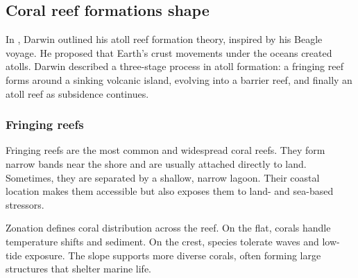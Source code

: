\subsection{Coral reef formations shape}
In \cite{Darwin1842}, Darwin outlined his atoll reef formation theory, inspired by his Beagle voyage. He proposed that Earth's crust movements under the oceans created atolls. Darwin described a three-stage process in atoll formation: a fringing reef forms around a sinking volcanic island, evolving into a barrier reef, and finally an atoll reef as subsidence continues.

\subsubsection{Fringing reefs}
Fringing reefs are the most common and widespread coral reefs. They form narrow bands near the shore and are usually attached directly to land. Sometimes, they are separated by a shallow, narrow lagoon. Their coastal location makes them accessible but also exposes them to land- and sea-based stressors.


Zonation defines coral distribution across the reef. On the flat, corals handle temperature shifts and sediment. On the crest, species tolerate waves and low-tide exposure. The slope supports more diverse corals, often forming large structures that shelter marine life.

